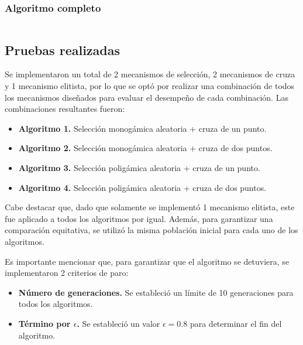 \subsubsection{Algoritmo completo}
\inputminted[linenos=true, fontsize=\scriptsize]{Python}{../demo.py}

\subsection{Pruebas realizadas}
Se implementaron un total de 2 mecanismos de selección, 2 mecanismos de cruza y 1 mecanismo elitista, por lo que se optó por realizar una combinación de todos los mecanismos diseñados para evaluar el desempeño de cada combinación. Las combinaciones resultantes fueron:

\begin{itemize}
	\item \textbf{Algoritmo 1.} Selección monogámica aleatoria + cruza de un punto.
	\item \textbf{Algoritmo 2.} Selección monogámica aleatoria + cruza de dos puntos.
	\item \textbf{Algoritmo 3.} Selección poligámica aleatoria + cruza de un punto.
	\item \textbf{Algoritmo 4.} Selección poligámica aleatoria + cruza de dos puntos.
\end{itemize}

Cabe destacar que, dado que solamente se implementó 1 mecanismo elitista, este fue aplicado a todos los algoritmos por igual. Además, para garantizar una comparación equitativa, se utilizó la misma población inicial para cada uno de los algoritmos.

Es importante mencionar que, para garantizar que el algoritmo se detuviera, se implementaron 2 criterios de paro:
\begin{itemize}
	\item \textbf{Número de generaciones.} Se estableció un límite de 10 generaciones para todos los algoritmos.
	\item \textbf{Término por $\epsilon$.} Se estableció un valor $\epsilon=0.8$ para determinar el fin del algoritmo.
\end{itemize}